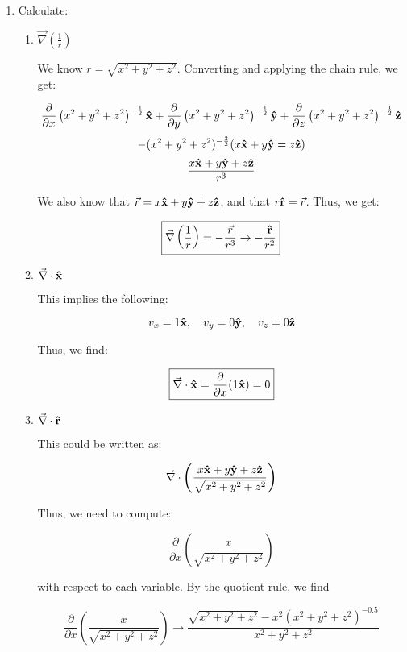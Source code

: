 \begin{enumerate}
    
  \item Calculate:

    \begin{enumerate}

      \item $\vec{\nabla}\left( \frac{1}{r} \right)$

        We know $r=\sqrt{x^2+y^2+z^2}$. Converting and applying the chain rule, we get:

        $$\frac{\partial}{\partial x}\left( x^2+y^2+z^2\right)^{-\frac{1}{2}}\bold{\hat{x}}+\frac{\partial}{\partial y}\left( x^2+y^2+z^2\right)^{-\frac{1}{2}}\bold{\hat{y}}+\frac{\partial}{\partial z}\left( x^2+y^2+z^2\right)^{-\frac{1}{2}}\bold{\hat{z}}$$
        $$-(x^2+y^2+z^2)^{-\frac{3}{2}}(x\bold{\hat{x}}+y\bold{\hat{y}}=z\bold{\hat{z}})$$
        $$\frac{x\bold{\hat{x}}+y\bold{\hat{y}}+z\bold{\hat{z}}}{r^3}$$

        We also know that $\vec{r}=x\bold{\hat{x}}+y\bold{\hat{y}}+z\bold{\hat{z}}$, and that $r\bold{\hat{r}}=\vec{r}$. Thus, we get:

        $$\boxed{\vec{\nabla}\left( \frac{1}{r} \right)=-\frac{\vec{r}}{r^3}\rightarrow-\frac{\bold{\hat{r}}}{r^2}}$$

      \item $\vec{\nabla}\cdot\bold{\hat{x}}$

        This implies the following:

        $$v_x=1\bold{\hat{x}},\quad v_y=0\bold{\hat{y}},\quad v_z=0\bold{\hat{z}}$$

        Thus, we find:

        $$\boxed{\vec{\nabla}\cdot\bold{\hat{x}}=\frac{\partial}{\partial x}(1\bold{\hat{x}})=0}$$

      \item $\vec{\nabla}\cdot\bold{\hat{r}}$

        This could be written as:

        $$\vec{\nabla}\cdot\left( \frac{x\bold{\hat{x}}+y\bold{\hat{y}}+z\bold{\hat{z}}}{\sqrt{x^2+y^2+z^2}} \right)$$

        Thus, we need to compute:

        $$\frac{\partial}{\partial x}\left(\frac{x}{\sqrt{x^2+y^2+z^2}}\right)$$

        with respect to each variable. By the quotient rule, we find

        $$\frac{\partial}{\partial x}\left(\frac{x}{\sqrt{x^2+y^2+z^2}}\right)\rightarrow \frac{\sqrt{x^2+y^2+z^2}-x^2(x^2+y^2+z^2)^{-0.5}}{x^2+y^2+z^2}$$


\end{enumerate}
\end{enumerate}
